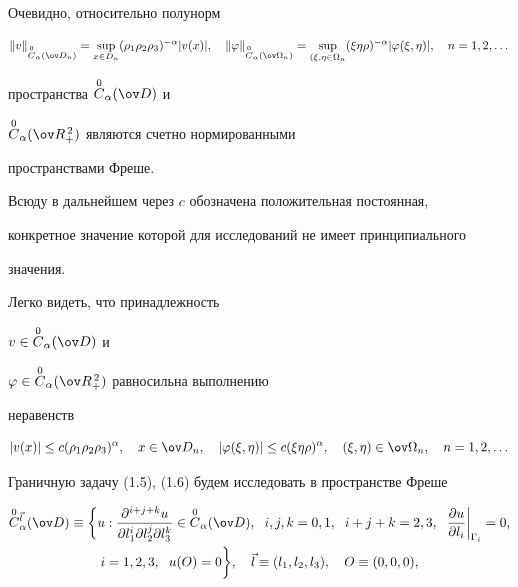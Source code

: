 Очевидно, относительно полунорм


$$


\|v\|_{\OC_\alpha(\ov D_n)}=\sup_{x\in D_n}


(\rho_1\rho_2\rho_3)^{-\alpha}|v(x)|,\quad


\|\varphi\|_{\OC_\alpha(\ov\Omega_n)}=\sup_{(\xi,\eta\in\Omega_n}


(\xi\eta\rho)^{-\alpha}|\varphi(\xi,\eta)|,\quad n=1,2,\dotsc


$$


пространства $\OC_\alpha(\ov D)$ и


$\OC_\alpha(\ov R^{\,2}_+)$ являются счетно нормированными


пространствами Фреше.





Всюду в дальнейшем через $c$ обозначена положительная постоянная,


конкретное значение которой для исследований не имеет принципиального


значения.





Легко видеть, что принадлежность


$v\in\OC_\alpha(\ov D)$ и


$\varphi\in\OC_\alpha(\ov R^{\,2}_+)$ равносильна выполнению


неравенств


\begin{equation}


|v(x)|\le c(\rho_1\rho_2\rho_3)^\alpha,\quad x\in\ov D_n,\quad


|\varphi(\xi,\eta)|\le c(\xi\eta\rho)^\alpha,\quad


(\xi,\eta)\in\ov\Omega_n,\quad n=1,2,\dotsc


\end{equation}





Граничную задачу (1.5), (1.6) будем исследовать в пространстве Фреше


\begin{multline*}


\OC^{\Vec l}_\alpha(\ov D)\equiv\bigg\{u:


\frac{\partial^{i+j+k}u}{\partial l^i_1\partial l^j_2\partial l^k_3}


\in\OC_\alpha(\ov D), \ \;i,j,k=0,1,\ \; i+j+k=2,3,\ \;


\frac{\partial u}{\partial l_i}\bigg|_{\Gamma_i}=0, \\


%


i=1,2,3,\ \; u(O)=0\bigg\},\quad \Vec l\equiv(l_1,l_2,l_3),\quad


O\equiv(0,0,0),


\end{multline*}


